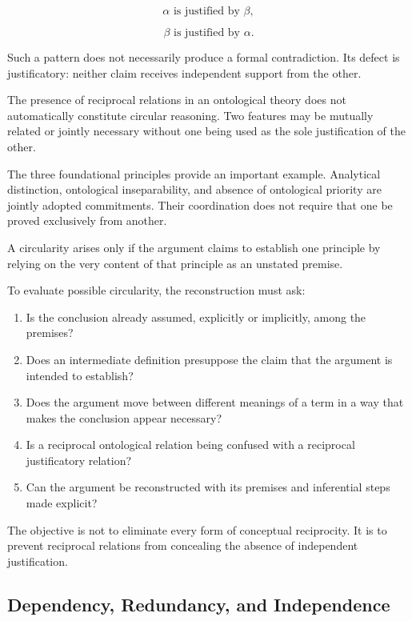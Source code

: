 \[
    \alpha \text{ is justified by } \beta,
\]

\[
    \beta \text{ is justified by } \alpha.
\]

Such a pattern does not necessarily produce a formal contradiction.
Its defect is justificatory: neither claim receives independent
support from the other.

The presence of reciprocal relations in an ontological theory
does not automatically constitute circular reasoning. Two
features may be mutually related or jointly necessary without
one being used as the sole justification of the other.

The three foundational principles provide an important example.
Analytical distinction, ontological inseparability, and absence
of ontological priority are jointly adopted commitments. Their
coordination does not require that one be proved exclusively
from another.

A circularity arises only if the argument claims to establish
one principle by relying on the very content of that principle
as an unstated premise.

To evaluate possible circularity, the reconstruction must ask:

\begin{enumerate}
    \item Is the conclusion already assumed, explicitly or
    implicitly, among the premises?

    \item Does an intermediate definition presuppose the
    claim that the argument is intended to establish?

    \item Does the argument move between different meanings
    of a term in a way that makes the conclusion appear
    necessary?

    \item Is a reciprocal ontological relation being confused
    with a reciprocal justificatory relation?

    \item Can the argument be reconstructed with its premises
    and inferential steps made explicit?
\end{enumerate}

The objective is not to eliminate every form of conceptual
reciprocity. It is to prevent reciprocal relations from
concealing the absence of independent justification.

\subsection{Dependency, Redundancy, and Independence}

